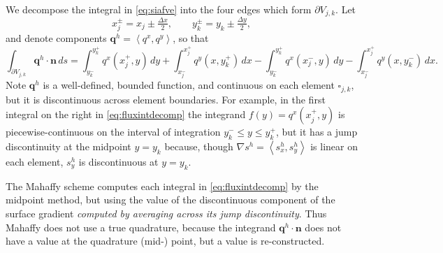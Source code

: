 \documentclass[twocolumn]{igs}
\newcommand\bn{\mathbf{n}}
\newcommand\bq{\mathbf{q}}
\newcommand{\grad}{\nabla}
\newcommand{\ip}[2]{\ensuremath{\left<#1,#2\right>}}
\newcommand{\dxtwo}{\tfrac{\Delta x}{2}}
\newcommand{\dytwo}{\tfrac{\Delta y}{2}}
\begin{document}
We decompose the integral in \eqref{eq:siafve} into the four edges which form $\partial V_{j,k}$.  Let
\begin{equation}
x_j^\pm = x_j \pm \dxtwo, \qquad y_k^\pm = y_k \pm \dytwo, \label{eq:definexypm}
\end{equation}
and denote components $\bq^h = \ip{q^x}{q^y}$, so that
\begin{equation}
  \int_{\partial V_{j,k}} \bq^h \cdot \bn\,ds = \int_{y_k^-}^{y_k^+} q^x(x_j^+,y)\,dy + \int_{x_j^-}^{x_j^+} q^y(x,y_k^+)\,dx - \int_{y_k^-}^{y_k^+} q^x(x_j^-,y)\,dy - \int_{x_j^-}^{x_j^+} q^y(x,y_k^-)\,dx. \label{eq:fluxintdecomp}
\end{equation}
Note $\bq^h$ is a well-defined, bounded function, and continuous on each element $\square_{j,k}$, but it is discontinuous across element boundaries.  For example, in the first integral on the right in \eqref{eq:fluxintdecomp} the integrand $f(y) = q^x(x_j^+,y)$ is piecewise-continuous on the interval of integration $y_k^- \le y \le y_k^+$, but it has a jump discontinuity at the midpoint $y=y_k$ because, though $\grad s^h = \ip{s^h_x}{s^h_y}$ is linear on each element, $s^h_y$ is discontinuous at $y=y_k$.

The Mahaffy scheme computes each integral in \eqref{eq:fluxintdecomp} by the midpoint method, but using the value of the discontinuous component of the surface gradient \emph{computed by averaging across its jump discontinuity}.  Thus Mahaffy does not use a true quadrature, because the integrand $\bq^h\cdot \bn$ does not have a value at the quadrature (mid-) point, but a value is re-constructed.
\end{document}
